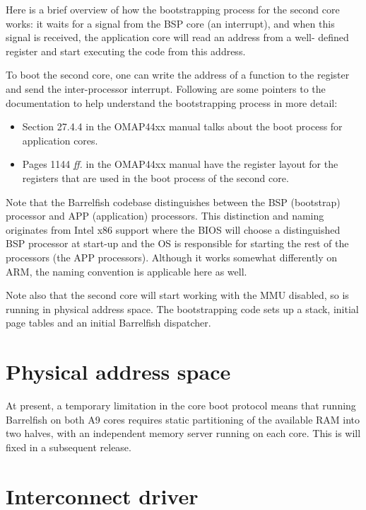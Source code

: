 \documentclass[a4paper,twoside]{report} %
\begin{document}

Here is a brief overview of how the bootstrapping process for the second core
works: it waits for a signal from the BSP core (an interrupt), and when this
signal is received, the application core will read an address from a well-
defined register and start executing the code from this address.

To boot the second core, one can write the address of
a function to the register and send the inter-processor
interrupt. Following are some pointers to the documentation to help
understand the bootstrapping process in more detail:

\begin{itemize}
\item Section 27.4.4 in the OMAP44xx manual talks about the boot process for
  application cores.
\item Pages 1144 \textit{ff.} in the OMAP44xx manual have the register
  layout for the registers that are used in the boot process of the
  second core. 
\end{itemize}

Note that the Barrelfish codebase distinguishes between the BSP (bootstrap)
processor and APP (application) processors. This distinction and naming
originates from Intel x86 support where the BIOS will choose a
distinguished BSP processor at start-up and the OS 
is responsible for starting the rest of the processors (the APP
processors). Although it works somewhat differently on 
ARM, the naming convention is applicable here as well.

Note also that the second core will start working with the MMU
disabled, so is running in physical address space.  The bootstrapping
code sets up a stack, initial page tables and an initial Barrelfish
dispatcher.

\section{Physical address space}

At present, a temporary limitation in the core boot protocol means
that running Barrelfish on both A9 cores requires static partitioning of
the available RAM into two halves, with an independent memory server
running on each core.   This is will fixed in a subsequent release. 

\section{Interconnect driver}\label{sec:interconnect}
\end{document}
